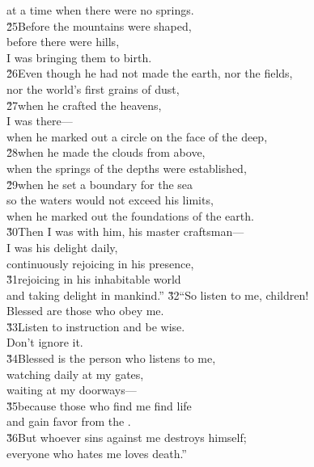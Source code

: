 \begin{poetry}
\poemlll       at a time when there were no springs. \\
\poeml \v{25}Before the mountains were shaped, \\
\poemll    before there were hills, \\
\poemlll       I was bringing them to birth. \\
\poeml \v{26}Even though he had not made the earth, nor the fields, \\
\poemll    nor the world's first grains of dust, \\
\poeml \v{27}when he crafted the heavens, \\
\poemll    I was there--- \\
\poemlll       when he marked out a circle on the face of the deep, \\
\poeml \v{28}when he made the clouds from above, \\
\poemll    when the springs of the depths were established, \\
\poeml \v{29}when he set a boundary for the sea \\
\poemll    so the waters would not exceed his limits, \\
\poemlll       when he marked out the foundations of the earth. \\
\poeml \v{30}Then I was with him, his master craftsman--- \\
\poemll    I was his delight daily, \\
\poemlll       continuously rejoicing in his presence, \\
\poeml \v{31}rejoicing in his inhabitable world \\
\poemll    and taking delight in mankind.''
\poeml \v{32}``So listen to me, children! \\
\poemll    Blessed are those who obey me. \\
\poeml \v{33}Listen to instruction and be wise. \\
\poemll    Don't ignore it. \\
\poeml \v{34}Blessed is the person who listens to me, \\
\poemll    watching daily at my gates, \\
\poemlll       waiting at my doorways--- \\
\poeml \v{35}because those who find me find life \\
\poemll    and gain favor from the . \\
\poeml \v{36}But whoever sins against me destroys himself; \\
\poemll    everyone who hates me loves death.''
\end{poetry}

